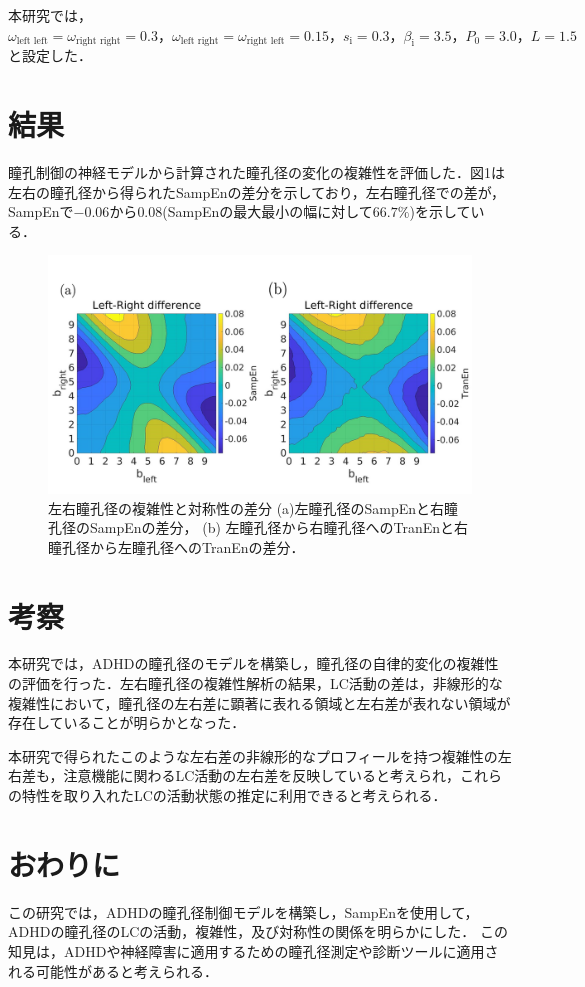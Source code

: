 \documentclass[10pt,twocolumn,a4j]{jsarticle}
\begin{document}
本研究では，$\omega_\text{left~left}=\omega_\text{right~right}=0.3， \omega_\text{left~right}=\omega_\text{right~left}=0.15，s_\text{i}=0.3， \beta_\text{i}=3.5， P_\text{0}=3.0， L=1.5$と設定した．


\section{結果}
瞳孔制御の神経モデルから計算された瞳孔径の変化の複雑性を評価した．図1は左右の瞳孔径から得られたSampEnの差分を示しており，左右瞳孔径での差が，SampEnで$-0.06$から$0.08$(SampEnの最大最小の幅に対して$66.7\%$)を示している．

\begin{figure}[H]
    \centering
     \includegraphics[keepaspectratio, scale=0.27]
      {result.png}
   \caption{左右瞳孔径の複雑性と対称性の差分
   (a)左瞳孔径のSampEnと右瞳孔径のSampEnの差分，
   (b) 左瞳孔径から右瞳孔径へのTranEnと右瞳孔径から左瞳孔径へのTranEnの差分．}
\end{figure}


\section{考察}
本研究では，ADHDの瞳孔径のモデルを構築し，瞳孔径の自律的変化の複雑性の評価を行った．左右瞳孔径の複雑性解析の結果，LC活動の差は，非線形的な複雑性において，瞳孔径の左右差に顕著に表れる領域と左右差が表れない領域が存在していることが明らかとなった．

本研究で得られたこのような左右差の非線形的なプロフィールを持つ複雑性の左右差も，注意機能に関わるLC活動の左右差を反映していると考えられ，これらの特性を取り入れたLCの活動状態の推定に利用できると考えられる．


\section{おわりに}
この研究では，ADHDの瞳孔径制御モデルを構築し，SampEnを使用して，ADHDの瞳孔径のLCの活動，複雑性，及び対称性の関係を明らかにした．
この知見は，ADHDや神経障害に適用するための瞳孔径測定や診断ツールに適用される可能性があると考えられる．


\end{document}
